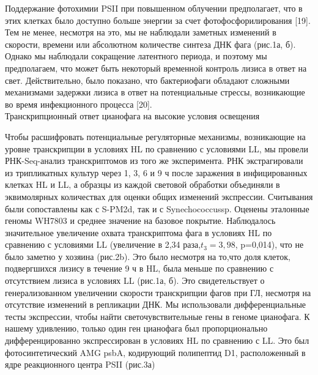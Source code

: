 \documentclass[a4paper,12pt]{article}
\begin{document}
            \par{Поддержание фотохимии PSII при повышенном облучении предполагает, что в этих клетках было доступно
            больше энергии за счет фотофосфорилирования [19]. Тем не менее, несмотря на это, мы не наблюдали заметных
            изменений в скорости, времени или абсолютном количестве синтеза ДНК фага (рис.1а, б). Однако мы наблюдали
            сокращение латентного периода, и поэтому мы предполагаем, что может быть некоторый временной контроль
            лизиса в ответ на свет. Действительно, было показано, что бактериофаги обладают сложными механизмами
            задержки лизиса в ответ на потенциальные стрессы, возникающие во время инфекционного процесса [20].}\\
        {\Large Транскрипционный ответ цианофага на высокие условия освещения}
            \par{Чтобы расшифровать потенциальные регуляторные механизмы, возникающие на уровне транскрипции в условиях
            HL по сравнению с условиями LL, мы провели РНК-Seq-анализ транскриптомов из того же эксперимента. РНК
            экстрагировали из трипликатных культур через 1, 3, 6 и 9 ч после заражения в инфицированных клетках HL и
            LL, а образцы из каждой световой обработки объединяли в эквимолярных количествах для оценки общих изменений
            экспрессии. Считывания были сопоставлены как с S-PM2d, так и с Synechococcussp. Оценены эталонные геномы
            WH7803 и среднее значение на базовое покрытие. Наблюдалось значительное увеличение охвата транскриптома
            фага в условиях HL по сравнению с условиями LL (увеличение в 2,34 раза,$t_3=3,98$, p=0,014), что не было
            заметно у хозяина (рис.2b). Это было несмотря на то,что доля клеток, подвергшихся лизису в течение 9 ч в
            HL, была меньше по сравнению с отсутствием лизиса в условиях LL (рис.1а, б). Это свидетельствует о
            генерализованном увеличении скорости транскрипции фагов при ГЛ, несмотря на отсутствие изменений в
            репликации ДНК. Мы использовали дифференциальные тесты экспрессии, чтобы найти светочувствительные гены в
            геноме цианофага. К нашему удивлению, только один ген цианофага был пропорционально дифференцированно
            экспрессирован в условиях HL по сравнению с LL. Это был фотосинтетический AMG psbA, кодирующий полипептид
            D1, расположенный в ядре реакционного центра PSII (рис.3а)}
\end{document}
